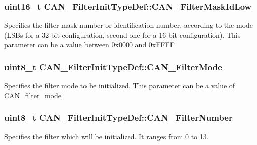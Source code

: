 \subsubsection[{C\+A\+N\+\_\+\+Filter\+Mask\+Id\+Low}]{\setlength{\rightskip}{0pt plus 5cm}uint16\+\_\+t C\+A\+N\+\_\+\+Filter\+Init\+Type\+Def\+::\+C\+A\+N\+\_\+\+Filter\+Mask\+Id\+Low}\label{struct_c_a_n___filter_init_type_def_a0f052daf04b0a481ecfa5c2cc8058089}
Specifies the filter mask number or identification number, according to the mode (L\+S\+Bs for a 32-\/bit configuration, second one for a 16-\/bit configuration). This parameter can be a value between 0x0000 and 0x\+F\+F\+F\+F \hypertarget{struct_c_a_n___filter_init_type_def_a7cfb23c48aad13a058c2619dbc062d8a}{}
\subsubsection[{C\+A\+N\+\_\+\+Filter\+Mode}]{\setlength{\rightskip}{0pt plus 5cm}uint8\+\_\+t C\+A\+N\+\_\+\+Filter\+Init\+Type\+Def\+::\+C\+A\+N\+\_\+\+Filter\+Mode}\label{struct_c_a_n___filter_init_type_def_a7cfb23c48aad13a058c2619dbc062d8a}
Specifies the filter mode to be initialized. This parameter can be a value of \hyperlink{group___c_a_n__filter__mode}{C\+A\+N\+\_\+filter\+\_\+mode} \hypertarget{struct_c_a_n___filter_init_type_def_af94466e1138c2b4fe6a67cf556981193}{}
\subsubsection[{C\+A\+N\+\_\+\+Filter\+Number}]{\setlength{\rightskip}{0pt plus 5cm}uint8\+\_\+t C\+A\+N\+\_\+\+Filter\+Init\+Type\+Def\+::\+C\+A\+N\+\_\+\+Filter\+Number}\label{struct_c_a_n___filter_init_type_def_af94466e1138c2b4fe6a67cf556981193}
Specifies the filter which will be initialized. It ranges from 0 to 13. \hypertarget{struct_c_a_n___filter_init_type_def_a9d52661aca538dbfcafdda6f16dddc82}{}
